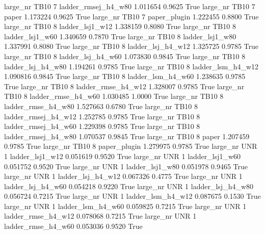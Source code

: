   large_nr     TB10                 7 ladder_rmsej_h4_w80    1.011654      0.9625    True
  large_nr     TB10                 7               paper    1.173224      0.9625    True
  large_nr     TB10                 7        paper_plugin    1.222455      0.8800    True
  large_nr     TB10                 8     ladder_lsj1_w12    1.338159      0.8080    True
  large_nr     TB10                 8     ladder_lsj1_w60    1.340659      0.7870    True
  large_nr     TB10                 8     ladder_lsj1_w80    1.337991      0.8080    True
  large_nr     TB10                 8   ladder_lsj_h4_w12    1.325725      0.9785    True
  large_nr     TB10                 8   ladder_lsj_h4_w60    1.073830      0.9845    True
  large_nr     TB10                 8   ladder_lsj_h4_w80    1.194261      0.9785    True
  large_nr     TB10                 8   ladder_lsm_h4_w12    1.090816      0.9845    True
  large_nr     TB10                 8   ladder_lsm_h4_w60    1.238635      0.9785    True
  large_nr     TB10                 8  ladder_rmse_h4_w12    1.328007      0.9785    True
  large_nr     TB10                 8  ladder_rmse_h4_w60    1.030485      1.0000    True
  large_nr     TB10                 8  ladder_rmse_h4_w80    1.527663      0.6780    True
  large_nr     TB10                 8 ladder_rmsej_h4_w12    1.252785      0.9785    True
  large_nr     TB10                 8 ladder_rmsej_h4_w60    1.229398      0.9785    True
  large_nr     TB10                 8 ladder_rmsej_h4_w80    1.070537      0.9845    True
  large_nr     TB10                 8               paper    1.207459      0.9785    True
  large_nr     TB10                 8        paper_plugin    1.279975      0.9785    True
  large_nr      UNR                 1     ladder_lsj1_w12    0.051619      0.9520    True
  large_nr      UNR                 1     ladder_lsj1_w60    0.051752      0.9520    True
  large_nr      UNR                 1     ladder_lsj1_w80    0.051978      0.9465    True
  large_nr      UNR                 1   ladder_lsj_h4_w12    0.067326      0.4775    True
  large_nr      UNR                 1   ladder_lsj_h4_w60    0.054218      0.9220    True
  large_nr      UNR                 1   ladder_lsj_h4_w80    0.056724      0.7215    True
  large_nr      UNR                 1   ladder_lsm_h4_w12    0.087675      0.1530    True
  large_nr      UNR                 1   ladder_lsm_h4_w60    0.059825      0.7215    True
  large_nr      UNR                 1  ladder_rmse_h4_w12    0.078068      0.7215    True
  large_nr      UNR                 1  ladder_rmse_h4_w60    0.053036      0.9520    True
